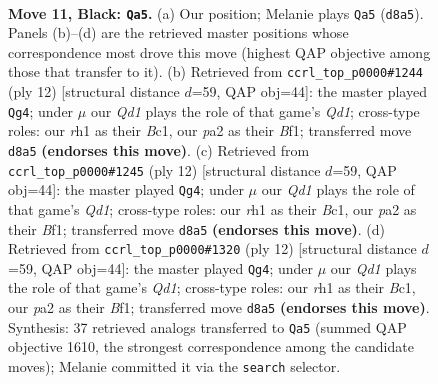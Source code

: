 \documentclass[11pt]{article}
\begin{document}
\clearpage

\begin{figure}[p]\centering
\begin{subfigure}{0.46\textwidth}\centering
\resizebox{\linewidth}{!}{%
\newchessgame
\chessboard[
  setfen={rnbqkb1r/p4ppp/2p1p3/2ppP3/3P1PPP/2P5/PP1N4/R1BQK1NR b KQq - 0 11},
  showmover=false,
  pgfstyle=straightmove, color=movearrow, markmove={d8-a5}
]}
\caption{}
\end{subfigure}\hfill
\begin{subfigure}{0.46\textwidth}\centering
\resizebox{\linewidth}{!}{%
\newchessgame
\chessboard[
  setfen={rnbqk2r/pp2nppp/4p3/2ppP3/3P4/P1P5/2P2PPP/R1BQKBNR w KQkq - 1 7},
  showmover=false,
  pgfstyle=straightmove, color=movearrow, markmove={d1-g4}
]}
\caption{}
\end{subfigure}
\\[4pt]
\begin{subfigure}{0.46\textwidth}\centering
\resizebox{\linewidth}{!}{%
\newchessgame
\chessboard[
  setfen={rnbqk2r/pp2nppp/4p3/2ppP3/3P4/P1P5/2P2PPP/R1BQKBNR w KQkq - 1 7},
  showmover=false,
  pgfstyle=straightmove, color=movearrow, markmove={d1-g4}
]}
\caption{}
\end{subfigure}\hfill
\begin{subfigure}{0.46\textwidth}\centering
\resizebox{\linewidth}{!}{%
\newchessgame
\chessboard[
  setfen={rnbqk2r/pp2nppp/4p3/2ppP3/3P4/P1P5/2P2PPP/R1BQKBNR w KQkq - 1 7},
  showmover=false,
  pgfstyle=straightmove, color=movearrow, markmove={d1-g4}
]}
\caption{}
\end{subfigure}
\caption{\textbf{Move 11, Black: \texttt{Qa5}.} (a) Our position; Melanie plays \texttt{Qa5} (\texttt{d8a5}). Panels (b)--(d) are the retrieved master positions whose correspondence most drove this move (highest QAP objective among those that transfer to it). (b) Retrieved from \texttt{ccrl\_top\_p0000\#1244} (ply 12) [structural distance $d$=59, QAP obj=44]: the master played \texttt{Qg4}; under $\mu$ our \emph{Qd1} plays the role of that game's \emph{Qd1}; cross-type roles: our \emph{r}h1 as their \emph{B}c1, our \emph{p}a2 as their \emph{B}f1; transferred move \texttt{d8a5} \textbf{(endorses this move)}. (c) Retrieved from \texttt{ccrl\_top\_p0000\#1245} (ply 12) [structural distance $d$=59, QAP obj=44]: the master played \texttt{Qg4}; under $\mu$ our \emph{Qd1} plays the role of that game's \emph{Qd1}; cross-type roles: our \emph{r}h1 as their \emph{B}c1, our \emph{p}a2 as their \emph{B}f1; transferred move \texttt{d8a5} \textbf{(endorses this move)}. (d) Retrieved from \texttt{ccrl\_top\_p0000\#1320} (ply 12) [structural distance $d$=59, QAP obj=44]: the master played \texttt{Qg4}; under $\mu$ our \emph{Qd1} plays the role of that game's \emph{Qd1}; cross-type roles: our \emph{r}h1 as their \emph{B}c1, our \emph{p}a2 as their \emph{B}f1; transferred move \texttt{d8a5} \textbf{(endorses this move)}. Synthesis: 37 retrieved analogs transferred to \texttt{Qa5} (summed QAP objective 1610, the strongest correspondence among the candidate moves); Melanie committed it via the \texttt{search} selector.}
\label{fig:thought-m21}
\end{figure}
\end{document}
